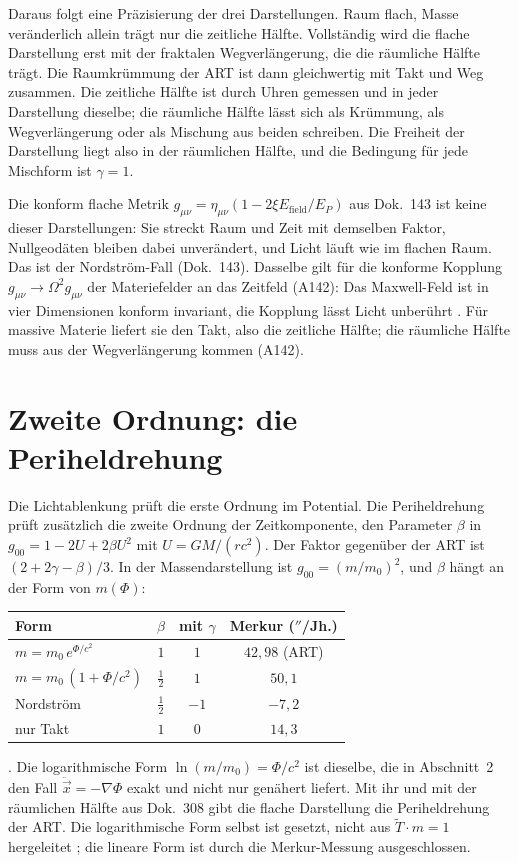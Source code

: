 Daraus folgt eine Präzisierung der drei Darstellungen. \glqq Raum flach, Masse veränderlich\grqq{}
allein trägt nur die zeitliche Hälfte. Vollständig wird die flache Darstellung erst mit der
fraktalen Wegverlängerung, die die räumliche Hälfte trägt. Die Raumkrümmung der ART ist dann
gleichwertig mit Takt und Weg zusammen. Die zeitliche Hälfte ist durch Uhren gemessen und in jeder
Darstellung dieselbe; die räumliche Hälfte lässt sich als Krümmung, als Wegverlängerung oder als
Mischung aus beiden schreiben. Die Freiheit der Darstellung liegt also in der räumlichen Hälfte,
und die Bedingung für jede Mischform ist $\gamma=1$.

Die konform flache Metrik
$g_{\mu\nu}=\eta_{\mu\nu}(1-2\xi E_{\text{field}}/E_P)$ aus Dok.~143 ist keine dieser Darstellungen:
Sie streckt Raum und Zeit mit demselben Faktor, Nullgeodäten bleiben dabei unverändert, und Licht
läuft wie im flachen Raum. Das ist der Nordström-Fall (Dok.~143). Dasselbe gilt für die konforme Kopplung $g_{\mu\nu}\to\Omega^2g_{\mu\nu}$ der
Materiefelder an das Zeitfeld (A142): Das Maxwell-Feld ist in vier Dimensionen konform invariant,
die Kopplung lässt Licht unberührt \BM. Für massive Materie liefert sie den Takt, also die
zeitliche Hälfte; die räumliche Hälfte muss aus der Wegverlängerung kommen (A142).

\section{Zweite Ordnung: die Periheldrehung}

Die Lichtablenkung prüft die erste Ordnung im Potential. Die Periheldrehung prüft zusätzlich die
zweite Ordnung der Zeitkomponente, den Parameter $\beta$ in $g_{00}=1-2U+2\beta U^2$ mit
$U=GM/(rc^2)$. Der Faktor gegenüber der ART ist $(2+2\gamma-\beta)/3$. In der Massendarstellung ist
$g_{00}=(m/m_0)^2$, und $\beta$ hängt an der Form von $m(\Phi)$:
\begin{center}
\begin{tabular}{lccc}
\toprule
Form & $\beta$ & mit $\gamma$ & Merkur ($''$/Jh.) \\
\midrule
$m=m_0\,e^{\Phi/c^2}$ & $1$ & $1$ & $42{,}98$ (ART) \\
$m=m_0\,(1+\Phi/c^2)$ & $\tfrac12$ & $1$ & $50{,}1$ \\
Nordström & $\tfrac12$ & $-1$ & $-7{,}2$ \\
nur Takt & $1$ & $0$ & $14{,}3$ \\
\bottomrule
\end{tabular}
\end{center}
\KM. Die logarithmische Form $\ln(m/m_0)=\Phi/c^2$ ist dieselbe, die in Abschnitt~2 den Fall
$\ddot{\vec x}=-\nabla\Phi$ exakt und nicht nur genähert liefert. Mit ihr und mit der räumlichen
Hälfte aus Dok.~308 gibt die flache Darstellung die Periheldrehung der ART. Die logarithmische
Form selbst ist gesetzt, nicht aus $\tilde T\cdot m=1$ hergeleitet \SM; die lineare Form ist
durch die Merkur-Messung ausgeschlossen.

